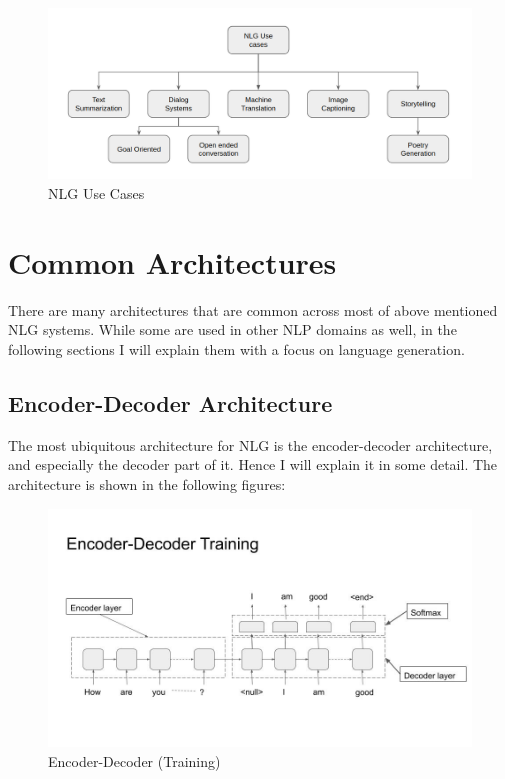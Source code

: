 \documentclass[]{krantz}
\begin{document}
\begin{figure}
\centering
\includegraphics{figures/04-01-use-case1/nlg_use_cases.png}
\caption{NLG Use Cases}
\end{figure}

\hypertarget{common-architectures}{%
\section{Common Architectures}\label{common-architectures}}

There are many architectures that are common across most of above mentioned NLG systems. While some are used in other NLP domains as well, in the following sections I will explain them with a focus on language generation.

\hypertarget{encoder-decoder-architecture}{%
\subsection{Encoder-Decoder Architecture}\label{encoder-decoder-architecture}}

The most ubiquitous architecture for NLG is the encoder-decoder architecture, and especially the decoder part of it. Hence I will explain it in some detail. The architecture is shown in the following figures:

\begin{figure}
\centering
\includegraphics{figures/04-01-use-case1/encoder_decoder_trg.jpg}
\caption{Encoder-Decoder (Training)}
\end{figure}
\end{document}
